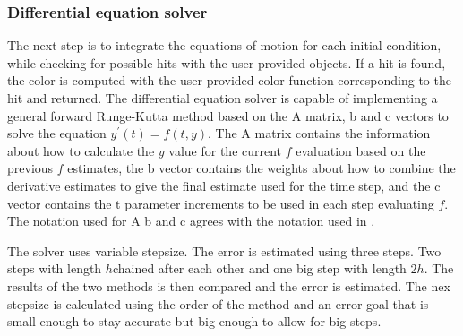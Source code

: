 \documentclass[pdftex,12pt,a4paper]{article}
\begin{document}
	\subsubsection{Differential equation solver}
		The next step is to integrate the equations of motion for each initial condition, while checking for possible hits with the user provided objects. If a hit is found, the color is computed with the user provided color function corresponding to the hit and returned. The differential equation solver is capable of implementing a general forward Runge-Kutta method based on the A matrix, b and c vectors to solve the equation $y^\prime(t) = f(t, y)$. The A matrix contains the information about how to calculate the $y$ value for the current $f$ evaluation based on the previous $f$ estimates, the b vector contains the weights about how to combine the derivative estimates to give the final estimate used for the time step, and the c vector contains the t parameter increments to be used in each step evaluating $f$. The notation used for A b and c agrees with the notation used in \cite{recipies}.
		
		The solver uses variable stepsize. The error is estimated using three steps. Two steps with length $h$chained after each other and one big step with length $2h$. The results of the two methods is then compared and the error is estimated. The nex stepsize is calculated using the order of the method and an error goal that is small enough to stay accurate but big enough to allow for big steps.
\end{document}
